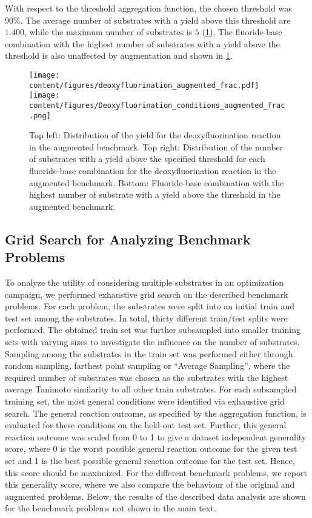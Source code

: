 With respect to the threshold aggregation function, the chosen threshold was $90\%$.
The average number of substrates with a yield above this threshold are $1.400$, while the maximum number of substrates is $5$ (\cref{fig:Deoxyfluorination_EDA_frac_augmented}).
The fluoride-base combination with the highest number of substrates with a yield above the threshold is also unaffected by augmentation and shown in \cref{fig:Deoxyfluorination_EDA_frac_augmented}.

\begin{figure}[h]
    \centering
    \texttt{[image: content/figures/deoxyfluorination\_augmented\_frac.pdf]}
    \texttt{[image: content/figures/Deoxyfluorination\_conditions\_augmented\_frac.png]}
    \caption{Top left: Distribution of the yield for the deoxyfluorination reaction in the augmented benchmark. Top right: Distribution of the number of substrates with a yield above the specified threshold for each fluoride-base combination for the deoxyfluorination reaction in the augmented benchmark. Bottom: Fluoride-base combination with the highest number of substrate with a yield above the threshold in the augmented benchmark.}
    \label{fig:Deoxyfluorination_EDA_frac_augmented}
\end{figure}
\newpage
\subsection{Grid Search for Analyzing Benchmark Problems} \label{subsec:data-analysis}

To analyze the utility of considering multiple substrates in an optimization campaign, we performed exhaustive grid search on the described benchmark problems. 
For each problem, the substrates were split into an initial train and test set among the substrates.
In total, thirty different train/test splits were performed.
The obtained train set was further subsampled into smaller training sets with varying sizes to investigate the influence on the number of substrates.
Sampling among the substrates in the train set was performed either through random sampling, farthest point sampling or ``Average Sampling'', where the required number of substrates was chosen as the substrates with the highest average Tanimoto similarity to all other train substrates.
For each subsampled training set, the most general conditions were identified via exhaustive grid search.
The general reaction outcome, as specified by the aggregation function, is evaluated for these conditions on the held-out test set.
Further, this general reaction outcome was scaled from 0 to 1 to give a dataset independent generality score, where 0 is the worst possible general reaction outcome for the given test set and 1 is the best possible general reaction outcome for the test set.
Hence, this score should be maximized.
For the different benchmark problems, we report this generality score, where we also compare the behaviour of the original and augmented problems.
Below, the results of the described data analysis are shown for the benchmark problems not shown in the main text.
\newpage
